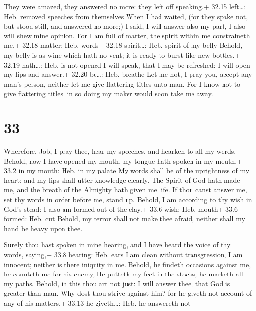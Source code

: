  They were amazed, they answered no more: they left off
speaking.+ 32.15 left\ldots: Heb. removed speeches from themselves
 When I had waited, (for they spake not, but stood still,
and answered no more;)  I said, I will answer also my part,
I also will shew mine opinion.  For I am full of matter,
the spirit within me constraineth me.+ 32.18 matter: Heb. words+ 32.18
spirit\ldots: Heb. spirit of my belly  Behold, my belly is
as wine which hath no vent; it is ready to burst like new bottles.+
32.19 hath\ldots: Heb. is not opened  I will speak, that I
may be refreshed: I will open my lips and answer.+ 32.20 be\ldots: Heb.
breathe  Let me not, I pray you, accept any man's person,
neither let me give flattering titles unto man.  For I know
not to give flattering titles; in so doing my maker would soon take me
away.

\hypertarget{section-32}{%
\section{33}\label{section-32}}

 Wherefore, Job, I pray thee, hear my speeches, and hearken
to all my words.  Behold, now I have opened my mouth, my
tongue hath spoken in my mouth.+ 33.2 in my mouth: Heb. in my palate
 My words shall be of the uprightness of my heart: and my
lips shall utter knowledge clearly.  The Spirit of God hath
made me, and the breath of the Almighty hath given me life. 
If thou canst answer me, set thy words in order before me, stand up.
 Behold, I am according to thy wish in God's stead: I also
am formed out of the clay.+ 33.6 wish: Heb. mouth+ 33.6 formed: Heb. cut
 Behold, my terror shall not make thee afraid, neither shall
my hand be heavy upon thee.

 Surely thou hast spoken in mine hearing, and I have heard
the voice of thy words, saying,+ 33.8 hearing: Heb. ears  I
am clean without transgression, I am innocent; neither is there iniquity
in me.  Behold, he findeth occasions against me, he
counteth me for his enemy,  He putteth my feet in the
stocks, he marketh all my paths.  Behold, in this thou art
not just: I will answer thee, that God is greater than man.
 Why dost thou strive against him? for he giveth not
account of any of his matters.+ 33.13 he giveth\ldots: Heb. he answereth
not

